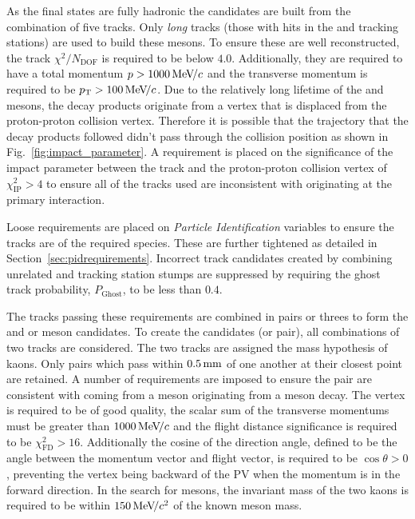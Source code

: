 As the final states are fully hadronic the candidates are built from the combination of five tracks. Only \emph{long} tracks (those with hits in the \velo and tracking stations) are used to build these mesons. To ensure these are well reconstructed, the track $\chi^{2}/N_{\text{DOF}}$ is required to be below $4.0$. Additionally, they are required to have a total momentum $\mbox{$p$} > 1000 {\mathrm{\,Me\kern -0.1em V\!/}c}$ and the transverse momentum is required to be $\mbox{$p_{\mathrm{ T}}$} > 100 {\mathrm{\,Me\kern -0.1em V\!/}c}$.
Due to the relatively long lifetime of the \Bp and \D mesons, the decay products originate from a vertex that is displaced from the proton-proton collision vertex. Therefore it is possible that the trajectory that the decay products followed didn't pass through the collision position as shown in Fig.~\ref{fig:impact_parameter}. A requirement is placed on the significance of the impact parameter between the track and the proton-proton collision vertex of $\chi^{2}_{\text{IP}} > 4$ to ensure all of the tracks used are inconsistent with originating at the primary interaction.  


Loose requirements are placed on \emph{Particle Identification} variables to ensure the tracks are of the required species. These are further tightened as detailed in Section~\ref{sec:pidrequirements}. Incorrect track candidates created by combining unrelated \velo and tracking station stumps are suppressed by requiring the ghost track probability, $P_{\text{Ghost}}$, to be less than $0.4$. 


The tracks passing these requirements are combined in pairs or threes to form the \Dsp and \phiz or \Dzb meson candidates.  
To create the \phiz candidates (or \Kp\Km pair), all combinations of two tracks are considered. The two tracks are assigned the mass hypothesis of kaons. Only pairs which pass within $0.5\mathrm{ \,mm}$ of one another at their closest point are retained. A number of requirements are imposed to ensure the pair are consistent with coming from a \phiz meson originating from a \Bp meson decay. The vertex is required to be of good quality, the scalar sum of the transverse momentums must be greater than $1000{\mathrm{\,Me\kern -0.1em V\!/}c}$ and the flight distance significance is required to be $\chi^{2}_{\text{FD} } > 16$. Additionally the cosine of the direction angle, defined to be the angle between the momentum vector and flight vector, is required to be $\cos{\theta}>0$, preventing the vertex being backward of the PV when the momentum is in the forward direction. In the search for \decay{\Bp}{\Dsp\phiz} mesons, the invariant mass of the two kaons is required to be within $150{\mathrm{\,Me\kern -0.1em V\!/}c^2}$ of the known \phiz meson mass.  

